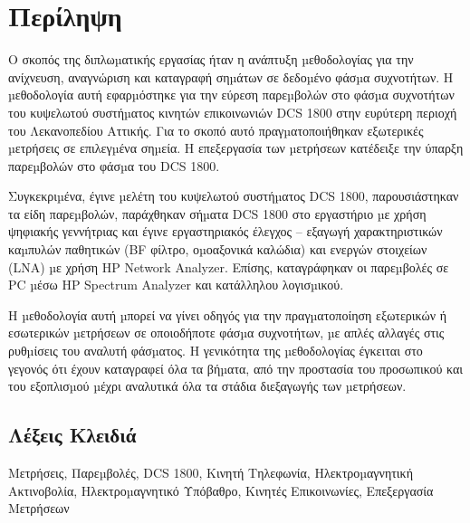 \maketitle

\blankpagecount

\examinationpage

\copyrightspage

\RaggedRight


\chapter*{Περίληψη}

Ο σκοπός της διπλωµατικής εργασίας ήταν η ανάπτυξη µεθοδολογίας για την
ανίχνευση, αναγνώριση και καταγραφή σηµάτων σε δεδοµένο φάσµα συχνοτήτων. Η
µεθοδολογία αυτή εφαρµόστηκε για την εύρεση παρεµβολών στο φάσµα συχνοτήτων του
κυψελωτού συστήµατος κινητών επικοινωνιών DCS 1800 στην ευρύτερη περιοχή του
Λεκανοπεδίου Αττικής. Για το σκοπό αυτό πραγµατοποιήθηκαν εξωτερικές µετρήσεις σε
επιλεγµένα σηµεία. Η επεξεργασία των µετρήσεων κατέδειξε την ύπαρξη παρεµβολών στο
φάσµα του DCS 1800.

Συγκεκριµένα, έγινε µελέτη του κυψελωτού συστήµατος DCS 1800, παρουσιάστηκαν
τα είδη παρεµβολών, παράχθηκαν σήµατα DCS 1800 στο εργαστήριο µε χρήση ψηφιακής
γεννήτριας και έγινε εργαστηριακός έλεγχος – εξαγωγή χαρακτηριστικών καµπυλών
παθητικών (BF φίλτρο, οµοαξονικά καλώδια) και ενεργών στοιχείων (LNA) µε χρήση HP
Network Analyzer. Επίσης, καταγράφηκαν οι παρεµβολές σε PC µέσω HP Spectrum
Analyzer και κατάλληλου λογισµικού.

Η µεθοδολογία αυτή µπορεί να γίνει οδηγός για την πραγµατοποίηση εξωτερικών ή
εσωτερικών µετρήσεων σε οποιοδήποτε φάσµα συχνοτήτων, µε απλές αλλαγές στις
ρυθµίσεις του αναλυτή φάσµατος. Η γενικότητα της µεθοδολογίας έγκειται στο γεγονός ότι
έχουν καταγραφεί όλα τα βήµατα, από την προστασία του προσωπικού και του εξοπλισµού
µέχρι αναλυτικά όλα τα στάδια διεξαγωγής των µετρήσεων.


\vspace{20ex}
\section*{Λέξεις Κλειδιά}
Μετρήσεις, Παρεµβολές, DCS 1800, Κινητή Τηλεφωνία, Ηλεκτροµαγνητική Ακτινοβολία,
Ηλεκτροµαγνητικό Υπόβαθρο, Κινητές Επικοινωνίες, Επεξεργασία Μετρήσεων


